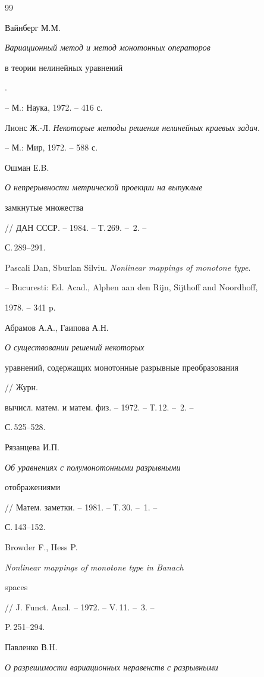 \begin{thebibliography}{99} 


 




Вайнберг М.М. {\em Вариационный метод и метод монотонных операторов


в теории нелинейных уравнений}. 


-- М.: Наука, 1972. -- 416 с. 




Лионс Ж.-Л. {\em Некоторые методы решения нелинейных краевых задач}. 


-- М.: Мир, 1972. -- 588 с. 




Ошман Е.B. {\em О непрерывности метрической проекции на выпуклые 


замкнутые множества} // ДАН СССР. -- 1984. -- Т.\,269. -- \No\,2. -- 


С.\,289--291. 




Pascali Dan, Sburlan Silviu. {\em Nonlinear mappings of monotone type}. 


-- Bucuresti: Ed. Acad., Alphen aan den Rijn, Sijthoff and Noordhoff, 


1978. -- 341 p. 




Абрамов А.А., Гаипова А.Н. {\em О существовании решений некоторых 


уравнений, содержащих монотонные разрывные преобразования} // Журн. 


вычисл. матем. и матем. физ. -- 1972. -- Т.\,12. -- \No\,2. -- 


С.\,525--528. 




Рязанцева И.П. {\em Об уравнениях с полумонотонными разрывными 


отображениями} // Матем. заметки. -- 1981. -- Т.\,30. -- \No\,1. -- 


С.\,143--152. 




Browder F., Hess P. {\em Nonlinear mappings of monotone type in Banach 


spaces} // J. Funct. Anal. -- 1972. -- V.\,11. -- \No\,3. -- 


P.\,251--294. 




Павленко В.Н. {\em О разрешимости вариационных неравенств с разрывными 


}
\end{thebibliography}

